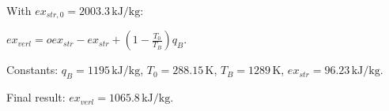 With \( ex_{str,0} = 2003.3 \, \text{kJ/kg} \):  

\( ex_{verl} = o ex_{str} - ex_{str} + \left( 1 - \frac{T_0}{T_B} \right) q_B \).  

Constants:  
\( q_B = 1195 \, \text{kJ/kg} \), \( T_0 = 288.15 \, \text{K} \), \( T_B = 1289 \, \text{K} \), \( ex_{str} = 96.23 \, \text{kJ/kg} \).  

Final result:  
\( ex_{verl} = 1065.8 \, \text{kJ/kg} \).